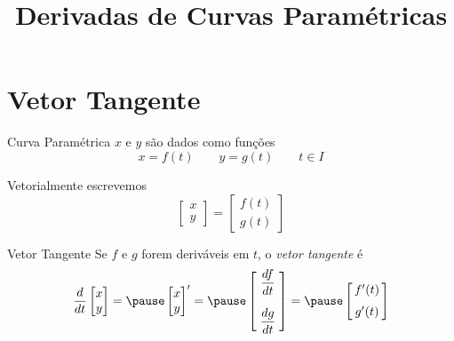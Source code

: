 
\usepackage{calculo_varias_variaveis-1}

\title {Derivadas de Curvas Paramétricas}



\addtitle

\section{Vetor Tangente}

\begin{frame}{Curva Paramétrica}
  $x$ e $y$ são dados como funções
  \[
    x = f(t)     \qquad
    y = g(t)     \qquad
    t \in I
  \]

  \pause
  Vetorialmente escrevemos
  \[
    \begin{bmatrix}  x    \\ y    \end{bmatrix} =
    \begin{bmatrix}  f(t) \\ g(t) \end{bmatrix}
  \]
\end{frame}

\begin{frame}{Vetor Tangente}
  Se $f$ e $g$ forem deriváveis em $t$, o \emph{vetor tangente} é
  \pause
  \[
    \frac{d}{dt}\begin{bmatrix}  x    \\ y    \end{bmatrix} =
    \pause
    \begin{bmatrix}  x    \\ y    \end{bmatrix}' =
    \pause
    \begin{bmatrix} \;\dfrac{df}{dt}\;\null \\[5mm] \;\dfrac{dg}{dt}\;\null \end{bmatrix} =
    \pause
    \begin{bmatrix} \,f'(t)\,\null \\[2mm] \,g'(t)\,\null \end{bmatrix}
  \]
\end{frame}

